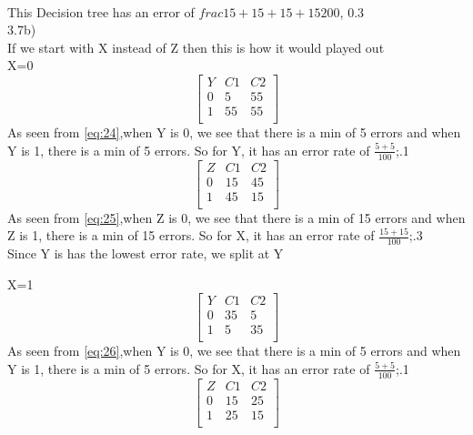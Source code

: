 \documentclass[12pt,english]{article}
\begin{document}
\\
This Decision tree has an error of $frac{15+15+15+15}{200}$, 0.3\\
3.7b)\\
If we start with X instead of Z then this is how it would played out\\
X=0\\
\begin{equation*}\tag{1}\label{eq:24}
\begin{bmatrix} Y & C1 & C2 \\0 & 5 &  55 \\1 & 55 &  55 \\ \end{bmatrix}
\end{equation*}
As seen from \eqref{eq:24},when Y is 0, we see that there is a min of 5 errors and when Y is 1, there is a min of 5 errors. So for Y, it has an error rate of $\frac{5+5}{100}$;.1\\
\begin{equation*}\tag{2}\label{eq:25}
\begin{bmatrix} Z & C1 & C2 \\0 & 15 &  45 \\1 & 45 &  15 \\ \end{bmatrix}
\end{equation*}
As seen from \eqref{eq:25},when Z is 0, we see that there is a min of 15 errors and when Z is 1, there is a min of 15 errors. So for X, it has an error rate of $\frac{15+15}{100}$;.3\\
Since Y is has the lowest error rate, we split at Y\par
X=1\\
\begin{equation*}\tag{1}\label{eq:26}
\begin{bmatrix} Y & C1 & C2 \\0 & 35 &  5 \\1 & 5 &  35 \\ \end{bmatrix}
\end{equation*}
As seen from \eqref{eq:26},when Y is 0, we see that there is a min of 5 errors and when Y is 1, there is a min of 5 errors. So for X, it has an error rate of $\frac{5+5}{100}$;.1\\
\begin{equation*}\tag{2}\label{eq:27}
\begin{bmatrix} Z & C1 & C2 \\0 & 15 &  25 \\1 & 25 &  15 \\ \end{bmatrix}
\end{equation*}
\end{document}
